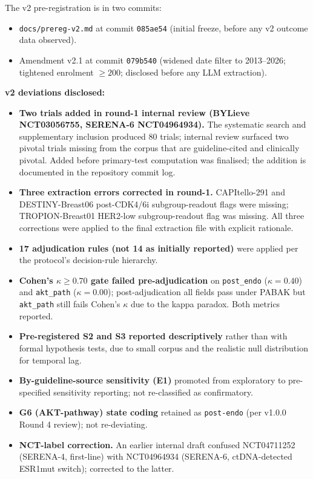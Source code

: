 \documentclass[11pt,a4paper]{article}
\begin{document}
The v2 pre-registration is in two commits:
\begin{itemize}
\item \texttt{docs/prereg-v2.md} at commit \texttt{085ae54} (initial freeze, before any v2 outcome data observed).
\item Amendment v2.1 at commit \texttt{079b540} (widened date filter to 2013--2026; tightened enrolment $\ge 200$; disclosed before any LLM extraction).
\end{itemize}

\textbf{v2 deviations disclosed:}
\begin{itemize}
\item \textbf{Two trials added in round-1 internal review (BYLieve NCT03056755, SERENA-6 NCT04964934).} The systematic search and supplementary inclusion produced 80 trials; internal review surfaced two pivotal trials missing from the corpus that are guideline-cited and clinically pivotal. Added before primary-test computation was finalised; the addition is documented in the repository commit log.
\item \textbf{Three extraction errors corrected in round-1.} CAPItello-291 and DESTINY-Breast06 post-CDK4/6i subgroup-readout flags were missing; TROPION-Breast01 HER2-low subgroup-readout flag was missing. All three corrections were applied to the final extraction file with explicit rationale.
\item \textbf{17 adjudication rules (not 14 as initially reported)} were applied per the protocol's decision-rule hierarchy.
\item \textbf{Cohen's $\kappa \ge 0.70$ gate failed pre-adjudication} on \texttt{post\_endo} ($\kappa = 0.40$) and \texttt{akt\_path} ($\kappa = 0.00$); post-adjudication all fields pass under PABAK but \texttt{akt\_path} still fails Cohen's $\kappa$ due to the kappa paradox. Both metrics reported.
\item \textbf{Pre-registered S2 and S3 reported descriptively} rather than with formal hypothesis tests, due to small corpus and the realistic null distribution for temporal lag.
\item \textbf{By-guideline-source sensitivity (E1)} promoted from exploratory to pre-specified sensitivity reporting; not re-classified as confirmatory.
\item \textbf{G6 (AKT-pathway) state coding} retained as \texttt{post-endo} (per v1.0.0 Round 4 review); not re-deviating.
\item \textbf{NCT-label correction.} An earlier internal draft confused NCT04711252 (SERENA-4, first-line) with NCT04964934 (SERENA-6, ctDNA-detected ESR1mut switch); corrected to the latter.
\end{itemize}
\end{document}
